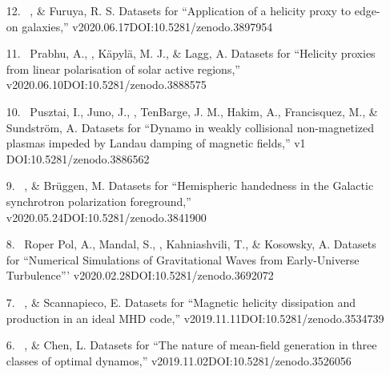 \begin{itemize}
\item[{12.}~]
\Brandenburg, \& Furuya, R. S.
{Datasets for ``Application of a helicity proxy to edge-on galaxies,'' v2020.06.17}{DOI:10.5281/zenodo.3897954}

\item[{11.}~]
Prabhu, A., \Brandenburg, K\"apyl\"a, M. J., \& Lagg, A.
{Datasets for ``Helicity proxies from linear polarisation of solar active regions,'' v2020.06.10}{DOI:10.5281/zenodo.3888575}

\item[{10.}~]
Pusztai, I., Juno, J., \Brandenburg, TenBarge, J. M., Hakim, A., Francisquez, M., \& Sundstr\"{o}m, A.
{Datasets for ``Dynamo in weakly collisional non-magnetized plasmas impeded by Landau damping of magnetic fields,'' v1}
{DOI:10.5281/zenodo.3886562}

\item[{9.}~]
\Brandenburg, \& Br\"uggen, M.
{Datasets for ``Hemispheric handedness in the Galactic synchrotron polarization foreground,'' v2020.05.24}{DOI:10.5281/zenodo.3841900}

\item[{8.}~]
Roper Pol, A., Mandal, S., \Brandenburg, Kahniashvili, T., \& Kosowsky, A.
{Datasets for ``Numerical Simulations of Gravitational Waves from Early-Universe Turbulence''' v2020.02.28}{DOI:10.5281/zenodo.3692072}

\item[{7.}~]
\Brandenburg, \& Scannapieco, E.
{Datasets for ``Magnetic helicity dissipation and production in an ideal MHD code,'' v2019.11.11}{DOI:10.5281/zenodo.3534739}

\item[{6.}~]
\Brandenburg, \& Chen, L.
{Datasets for ``The nature of mean-field generation in three classes of optimal dynamos,'' v2019.11.02}{DOI:10.5281/zenodo.3526056}


\end{itemize}
